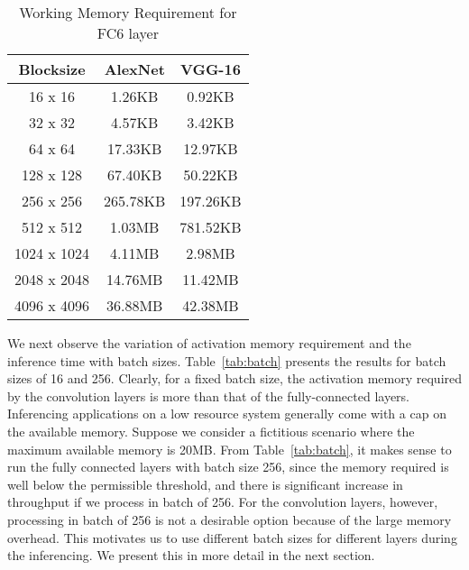 \begin{table}[h!]
\centering
\begin{tabular}{|c|c|c|}
           \hline
Blocksize & AlexNet  & VGG-16 \\ \hline
  16  x   16 &    1.26KB &  0.92KB \\ \hline
  32  x   32 &    4.57KB &   3.42KB \\ \hline
  64  x   64 &   17.33KB &  12.97KB \\ \hline
 128  x  128 &   67.40KB &  50.22KB \\ \hline
 256  x  256 &  265.78KB & 197.26KB \\ \hline
 512  x  512 &    1.03MB & 781.52KB \\ \hline
1024  x 1024 &    4.11MB &   2.98MB \\ \hline
2048  x 2048 &   14.76MB &  11.42MB \\ \hline
4096  x 4096 &   36.88MB &  42.38MB \\ \hline

\end{tabular}
\caption{Working Memory Requirement for FC6 layer}
\label{tab:workmem}

\end{table}




We next observe  the variation of activation memory requirement and the inference time with batch sizes. Table~\ref{tab:batch}   presents
the results for batch sizes of 16 and 256. Clearly, for a fixed batch size,  the activation memory required by the convolution layers is  more than  that of the 
fully-connected layers.  Inferencing applications on a low resource system generally come with a cap on the available memory. 
Suppose we consider a fictitious scenario where the maximum available memory is 20MB. 
From Table~\ref{tab:batch}, it makes sense to run the fully connected layers with batch size 256, since the memory required is well below the
permissible threshold, and there is significant increase in throughput if we process in batch of 256. 
For the convolution layers, however, processing in batch of 256 is not a desirable option because of the large memory overhead.
This motivates us to use different batch sizes for different layers during the inferencing. We present this in more detail in the next section.

 



